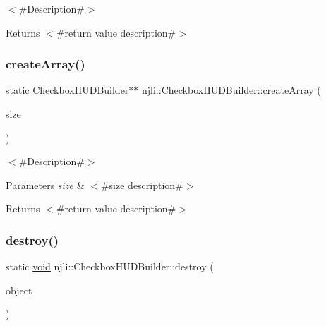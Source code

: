 $<$\#\+Description\#$>$

\begin{DoxyReturn}{Returns}
$<$\#return value description\#$>$ 
\end{DoxyReturn}
\mbox{\label{classnjli_1_1_checkbox_h_u_d_builder_a8d672a58479cbd42b61be49167271d46}} 
\subsubsection{\texorpdfstring{create\+Array()}{createArray()}}
{\footnotesize\ttfamily static \mbox{\hyperlink{classnjli_1_1_checkbox_h_u_d_builder}{Checkbox\+H\+U\+D\+Builder}}$\ast$$\ast$ njli\+::\+Checkbox\+H\+U\+D\+Builder\+::create\+Array (\begin{DoxyParamCaption}\item[{const \mbox{\hyperlink{_util_8h_a10e94b422ef0c20dcdec20d31a1f5049}{u32}}}]{size }\end{DoxyParamCaption})\hspace{0.3cm}{\ttfamily [static]}}

$<$\#\+Description\#$>$


\begin{DoxyParams}{Parameters}
{\em size} & $<$\#size description\#$>$\\
\hline
\end{DoxyParams}
\begin{DoxyReturn}{Returns}
$<$\#return value description\#$>$ 
\end{DoxyReturn}
\mbox{\label{classnjli_1_1_checkbox_h_u_d_builder_a5b5a554a3ce28b4a0a913f2e2239d193}} 
\subsubsection{\texorpdfstring{destroy()}{destroy()}}
{\footnotesize\ttfamily static \mbox{\hyperlink{_thread_8h_af1e856da2e658414cb2456cb6f7ebc66}{void}} njli\+::\+Checkbox\+H\+U\+D\+Builder\+::destroy (\begin{DoxyParamCaption}\item[{\mbox{\hyperlink{classnjli_1_1_checkbox_h_u_d_builder}{Checkbox\+H\+U\+D\+Builder}} $\ast$}]{object }\end{DoxyParamCaption})\hspace{0.3cm}{\ttfamily [static]}}

